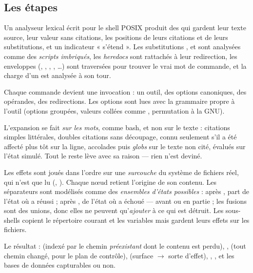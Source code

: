 \subsection{Les étapes}
\begin{description}[style=nextline,leftmargin=0.6cm,font=\sffamily\bfseries]
  \item[Analyse syntaxique (\fichier{model.py})]
    Un analyseur lexical écrit pour le shell POSIX produit des  qui gardent leur
    texte source, leur valeur sans citations, les positions de leurs citations et de leurs
    substitutions, et un indicateur « s'étend ». Les substitutions \cmd{\$(\ldots)},
     et \cmd{<(\ldots)} sont analysées comme des \emph{scripts imbriqués}, les
    \textit{heredocs} sont rattachés à leur redirection, les enveloppes (,
    , , , \ldots) sont traversées pour trouver le
    vrai mot de commande, et la charge d'un  est analysée à son tour.
  \item[Invocations et grammaires (\fichier{invocation.py})]
    Chaque commande devient une invocation : un outil, des options canoniques, des
    opérandes, des redirections. Les options sont lues avec la grammaire propre à l'outil
    (options groupées, valeurs collées comme , permutation à la GNU).
  \item[Expansion des mots (\fichier{words.py})]
    L'expansion se fait \emph{sur les mots}, comme bash, et non sur le texte : citations
    simples littérales, doubles citations sans découpage,  connu seulement s'il a
    été affecté plus tôt sur la ligne, accolades puis \textit{globs} sur le texte non cité,
    évalués sur l'état simulé. Tout le reste lève  avec sa raison --- rien n'est
    deviné.
  \item[Simulation (\fichier{simulate.py})]
    Les effets sont joués dans l'ordre sur une \emph{surcouche} du système de fichiers réel,
    qui n'est que lu (, ). Chaque nœud retient l'origine de son
    contenu. Les séparateurs sont modélisés comme des \emph{ensembles d'états possibles} :
    après ,  part de l'état où  a réussi ; après , de
    l'état où  a échoué --- avant  ou en partie ; les fusions sont des unions,
    donc elles ne peuvent qu'\emph{ajouter} à ce qui est détruit. Les sous-shells copient le
    répertoire courant et les variables mais gardent leurs effets sur les fichiers.
  \item[Impact (\fichier{effects.py})]
    Le résultat :  (indexé par le chemin \emph{préexistant} dont le contenu est
    perdu), ,  (tout chemin changé, pour le plan de contrôle),
     (surface $\rightarrow$ sorte d'effet), , , et
    les bases de données capturables ou non.
\end{description}

